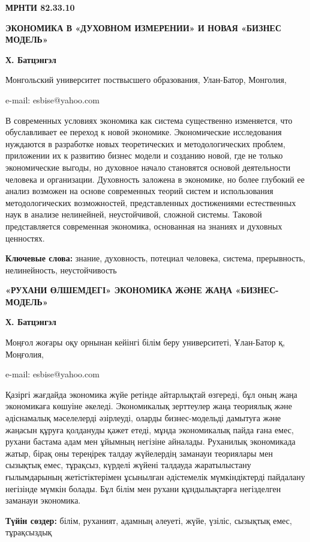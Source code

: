 \emph{{\bfseries \hfill\break
}}\newpage
{\bfseries МРНТИ 82.33.10}

{\bfseries ЭКОНОМИКА В «ДУХОВНОМ ИЗМЕРЕНИИ» И НОВАЯ «БИЗНЕС МОДЕЛЬ»}

{\bfseries Х. Батцэнгэл}

Монгольский университет поствысшего образования, Улан-Батор, Монголия,

e-mail: esbise@yahoo.com

В современных условиях экономика как система существенно изменяется, что
обуславливает ее переход к новой экономике. Экономические исследования
нуждаются в разработке новых теоретических и методологических проблем,
приложении их к развитию бизнес модели и созданию новой, где не только
экономические выгоды, но духовное начало становятся основой деятельности
человека и организации. Духовность заложена в экономике, но более
глубокий ее анализ возможен на основе современных теорий систем и
использования методологических возможностей, представленных достижениями
естественных наук в анализе нелинейней, неустойчивой, сложной системы.
Таковой представляется современная экономика, основанная на знаниях и
духовных ценностях.

{\bfseries Ключевые слова:} знание, духовность, потециал человека, система,
прерывность, нелинейность, неустойчивость

{\bfseries «РУХАНИ ӨЛШЕМДЕГІ» ЭКОНОМИКА ЖӘНЕ ЖАҢА «БИЗНЕС-МОДЕЛЬ»}

{\bfseries Х. Батцэнгэл}

Моңғол жоғары оқу орнынан кейінгі білім беру университеті, Ұлан-Батор қ,
Моңғолия,

e-mail: esbise@yahoo.com

Қазіргі жағдайда экономика жүйе ретінде айтарлықтай өзгереді, бұл оның
жаңа экономикаға көшуіне әкеледі. Экономикалық зерттеулер жаңа теориялық
және әдіснамалық мәселелерді әзірлеуді, оларды бизнес-модельді дамытуға
және жаңасын құруға қолдануды қажет етеді, мұнда экономикалық пайда ғана
емес, рухани бастама адам мен ұйымның негізіне айналады. Руханилық
экономикада жатыр, бірақ оны тереңірек талдау жүйелердің заманауи
теориялары мен сызықтық емес, тұрақсыз, күрделі жүйені талдауда
жаратылыстану ғылымдарының жетістіктерімен ұсынылған әдістемелік
мүмкіндіктерді пайдалану негізінде мүмкін болады. Бұл білім мен рухани
құндылықтарға негізделген заманауи экономика.

{\bfseries Түйін сөздер:} білім, руханият, адамның әлеуеті, жүйе, үзіліс,
сызықтық емес, тұрақсыздық

